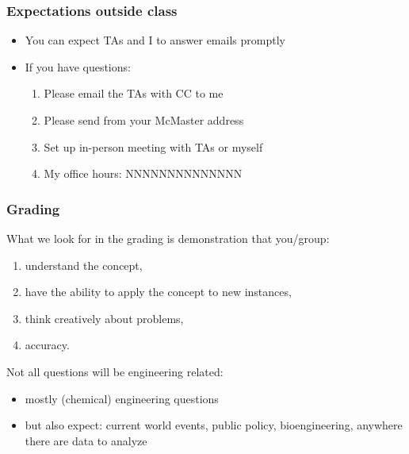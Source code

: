 \begin{frame}\frametitle{Expectations outside class}
	\begin{itemize}
		\item	You can expect TAs and I to answer emails promptly 
		\item	If you have questions: 
		\begin{enumerate}
			\item	Please email the TAs with CC to me \hfill {\tiny{\color{myOrange}{$\longleftarrow$ hopefully this solves your problem}}}
			\item	Please send from your McMaster address
			\item	Set up in-person meeting with TAs or myself 
			\item	My office hours: NNNNNNNNNNNNNN
		\end{enumerate}
	\end{itemize}
\end{frame}

\begin{frame}\frametitle{Grading}
	
	What we look for in the grading is demonstration that you/group: 
	\begin{enumerate}
		\item	understand the concept, 
		\item	have the ability to apply the concept to new instances, 
		\item	think creatively about problems, 
		\item	accuracy. 
	\end{enumerate}
	
	Not all questions will be engineering related: 
	\begin{itemize}
		\item	mostly (chemical) engineering questions 
		\item	but also expect: current world events, public policy, bioengineering, anywhere there are data to analyze 
	\end{itemize}
\end{frame}

